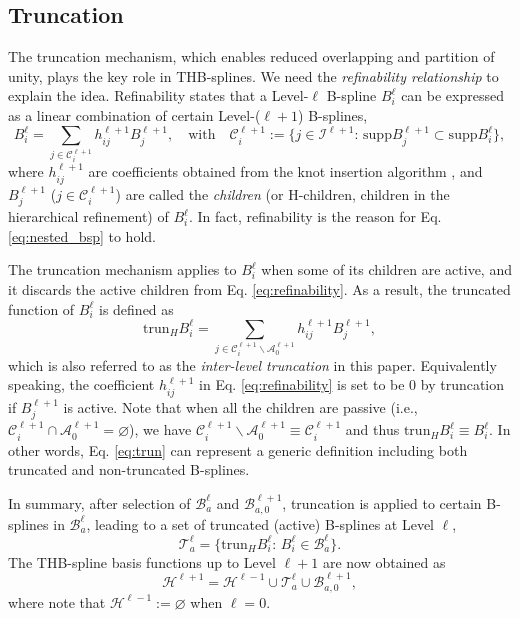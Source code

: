\documentclass[graybox]{svmult}
\begin{document}
\subsection{Truncation}

The truncation mechanism, which enables reduced overlapping and partition of unity, plays the key role in THB-splines. We need the \emph{refinability relationship} to explain the idea. Refinability states that a Level-$\ell$ B-spline $B_i^\ell$ can be expressed as a linear combination of certain Level-($\ell+1$) B-splines,
\begin{equation}
B_i^\ell = \sum_{j \in \mathcal{C}_i^{\ell+1} } h_{ij}^{\ell+1} B_j^{\ell+1} , \quad \text{with} \quad \mathcal{C}_i^{\ell+1} := \{ j\in \mathcal{I}^{\ell+1} :\, \mathrm{supp}B_j^{\ell+1} \subset \mathrm{supp} B_i^\ell \} ,
\label{eq:refinability}
\end{equation}
where $h_{ij}^{\ell+1}$ are coefficients obtained from the knot insertion algorithm \cite{ref:boehm80}, and $B_j^{\ell+1}$ ($j\in\mathcal{C}_i^{\ell+1}$) are called the \emph{children} (or H-children, children in the hierarchical refinement) of $B_i^\ell$. In fact, refinability is the reason for Eq. \eqref{eq:nested_bsp} to hold.

The truncation mechanism applies to $B_i^\ell$ when some of its children are active, and it discards the active children from Eq. \eqref{eq:refinability}. As a result, the truncated function of $B_i^\ell$ is defined as
\begin{equation}
\mathrm{trun}_H B_i^\ell = \sum_{j \in \mathcal{C}_i^{\ell+1} \backslash \mathcal{A}_0^{\ell+1} } h_{ij}^{\ell+1} B_j^{\ell+1},
\label{eq:trun}
\end{equation}
which is also referred to as the \emph{inter-level truncation} in this paper.
Equivalently speaking, the coefficient $h_{ij}^{\ell+1}$ in Eq. \eqref{eq:refinability} is set to be $0$ by truncation if $B_j^{\ell+1}$ is active. Note that when all the children are passive (i.e., $\mathcal{C}_i^{\ell+1} \cap \mathcal{A}_0^{\ell+1} =\varnothing$), we have $\mathcal{C}_i^{\ell+1} \backslash \mathcal{A}_0^{\ell+1} \equiv \mathcal{C}_i^{\ell+1}$ and thus $\mathrm{trun}_H B_i^\ell \equiv B_i^\ell$. In other words, Eq. \eqref{eq:trun} can represent a generic definition including both truncated and non-truncated B-splines.

In summary, after selection of $\mathcal{B}_a^\ell$ and $\mathcal{B}_{a,0}^{\ell+1}$, truncation is applied to certain B-splines in $\mathcal{B}_a^\ell$, leading to a set of truncated (active) B-splines at Level $\ell$,
\begin{equation}
\mathcal{T}_a^{\ell} = \{ \mathrm{trun}_H B_i^\ell : \, B_i^\ell \in \mathcal{B}_a^\ell  \} .
\label{eq:tal}
\end{equation}
The THB-spline basis functions up to Level $\ell+1$ are now obtained as
\begin{equation}
\mathcal{H}^{\ell+1} = \mathcal{H}^{\ell-1} \cup \mathcal{T}_a^\ell \cup \mathcal{B}_{a,0}^{\ell+1} ,
\label{eq:THB_basis}
\end{equation}
where note that $\mathcal{H}^{\ell-1}:=\varnothing$ when $\ell=0$.
\end{document}
